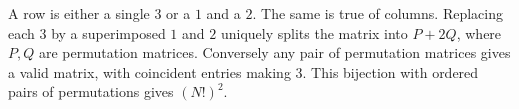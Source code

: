 A row is either a single $3$ or a $1$ and a $2$. The same is true of columns. Replacing each $3$ by a superimposed $1$ and $2$ uniquely splits the matrix into $P+2Q$, where $P,Q$ are permutation matrices. Conversely any pair of permutation matrices gives a valid matrix, with coincident entries making $3$. This bijection with ordered pairs of permutations gives $\boxed{(N!)^2}$.
